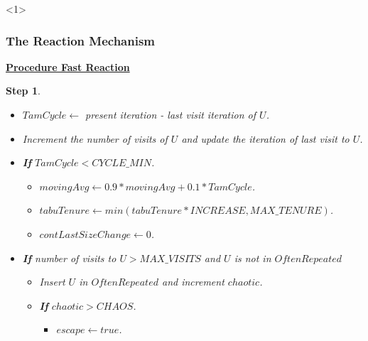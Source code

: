 \documentclass{beamer}
\newtheorem{step}{Step}
\begin{document}
\begin{frame}<1>
  \frametitle{The Reaction Mechanism}

{ \footnotesize

\begin{block}

\underline{\bf Procedure Fast Reaction}

\begin{step} 

\begin{itemize}
    \item[-] $TamCycle \leftarrow$ present iteration - last visit iteration of $U$.
    \item[-] Increment the number of visits of $U$ and update the iteration of last visit to $U$.
    \item[-] \textbf{If} $TamCycle < CYCLE\_MIN$.
        \begin{itemize}
        \item[-] $movingAvg \leftarrow 0.9 * movingAvg + 0.1 * TamCycle$.
        \item[-] $tabuTenure \leftarrow min(tabuTenure * INCREASE, MAX\_TENURE)$.
        \item[-] $contLastSizeChange \leftarrow 0$.
        \end{itemize}
    \item[-] \textbf{If} number of visits to $U > MAX\_VISITS$ and $U$ is not in $OftenRepeated$
        \begin{itemize}
        \item[-] Insert $U$ in $OftenRepeated$ and increment $chaotic$.
        \item[-] \textbf{If} $chaotic > CHAOS$.
            \begin{itemize}
            \item[-] $escape \leftarrow true$.
            \end{itemize}
        \end{itemize}
\end{itemize}

\end{step}

\end{block}
}

\end{frame}
\end{document}
